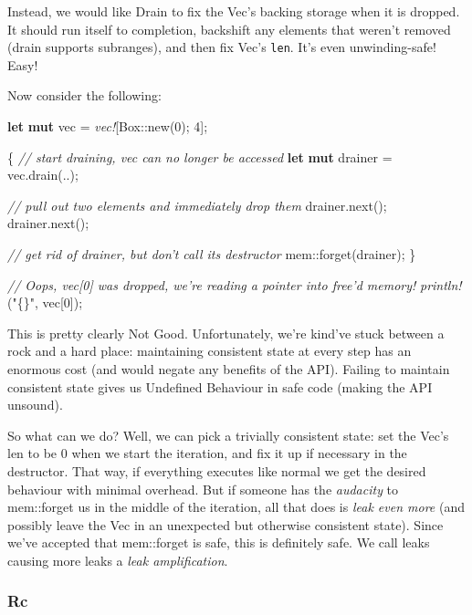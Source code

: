 \documentclass[a4paper,]{book}
\newenvironment{Shaded}{\begin{snugshade}}{\end{snugshade}}
\newcommand{\KeywordTok}[1]{\textcolor[rgb]{0.13,0.29,0.53}{\textbf{{#1}}}}
\newcommand{\DataTypeTok}[1]{\textcolor[rgb]{0.13,0.29,0.53}{{#1}}}
\newcommand{\DecValTok}[1]{\textcolor[rgb]{0.00,0.00,0.81}{{#1}}}
\newcommand{\StringTok}[1]{\textcolor[rgb]{0.31,0.60,0.02}{{#1}}}
\newcommand{\CommentTok}[1]{\textcolor[rgb]{0.56,0.35,0.01}{\textit{{#1}}}}
\newcommand{\PreprocessorTok}[1]{\textcolor[rgb]{0.56,0.35,0.01}{\textit{{#1}}}}
\newcommand{\NormalTok}[1]{{#1}}
\begin{document}
Instead, we would like Drain to fix the Vec's backing storage when it is
dropped. It should run itself to completion, backshift any elements that
weren't removed (drain supports subranges), and then fix Vec's
\texttt{len}. It's even unwinding-safe! Easy!

Now consider the following:

\begin{Shaded}
\begin{Highlighting}[]
\KeywordTok{let} \KeywordTok{mut} \NormalTok{vec = }\PreprocessorTok{vec!}\NormalTok{[}\DataTypeTok{Box}\NormalTok{::new(}\DecValTok{0}\NormalTok{); }\DecValTok{4}\NormalTok{];}

\NormalTok{\{}
    \CommentTok{// start draining, vec can no longer be accessed}
    \KeywordTok{let} \KeywordTok{mut} \NormalTok{drainer = vec.drain(..);}

    \CommentTok{// pull out two elements and immediately drop them}
    \NormalTok{drainer.next();}
    \NormalTok{drainer.next();}

    \CommentTok{// get rid of drainer, but don't call its destructor}
    \NormalTok{mem::forget(drainer);}
\NormalTok{\}}

\CommentTok{// Oops, vec[0] was dropped, we're reading a pointer into free'd memory!}
\PreprocessorTok{println!}\NormalTok{(}\StringTok{"\{\}"}\NormalTok{, vec[}\DecValTok{0}\NormalTok{]);}
\end{Highlighting}
\end{Shaded}

This is pretty clearly Not Good. Unfortunately, we're kind've stuck
between a rock and a hard place: maintaining consistent state at every
step has an enormous cost (and would negate any benefits of the API).
Failing to maintain consistent state gives us Undefined Behaviour in
safe code (making the API unsound).

So what can we do? Well, we can pick a trivially consistent state: set
the Vec's len to be 0 when we start the iteration, and fix it up if
necessary in the destructor. That way, if everything executes like
normal we get the desired behaviour with minimal overhead. But if
someone has the \emph{audacity} to mem::forget us in the middle of the
iteration, all that does is \emph{leak even more} (and possibly leave
the Vec in an unexpected but otherwise consistent state). Since we've
accepted that mem::forget is safe, this is definitely safe. We call
leaks causing more leaks a \emph{leak amplification}.

\subsubsection{Rc}\label{rc}
\end{document}
